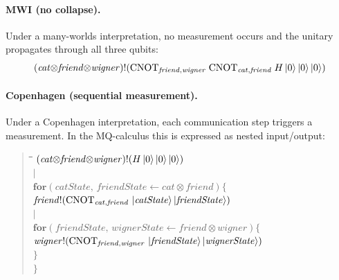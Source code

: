 \documentclass[11pt]{article}
\newcommand{\CNOT}{\mathrm{CNOT}}
\begin{document}
\paragraph{MWI (no collapse).}
Under a many-worlds interpretation, no measurement occurs and the
unitary propagates through all three qubits:
\begin{equation*}
  (\mathit{cat}{\otimes}\mathit{friend}{\otimes}\mathit{wigner})!\!\left(
    \CNOT_{\mathit{friend},\mathit{wigner}}\;
    \CNOT_{\mathit{cat},\mathit{friend}}\;
    H\ket{0}\ket{0}\ket{0}
  \right)
\end{equation*}

\paragraph{Copenhagen (sequential measurement).}
Under a Copenhagen interpretation, each communication step triggers a
measurement.  In the MQ-calculus this is expressed as nested
input/output:

\medskip

\begin{quote}
\begin{minipage}{\dimexpr\textwidth-2em}
\begin{tabbing}
\hspace{2em}\=\hspace{2em}\=\hspace{2em}\=\kill
$(\mathit{cat}{\otimes}\mathit{friend}{\otimes}\mathit{wigner})!\!\left(
  H\ket{0}\ket{0}\ket{0}\right)$ \\[4pt]
$\Big|$ \\[4pt]
$\mathbf{for}\!\left(
  \mathit{catState},\, \mathit{friendState}
  \leftarrow \mathit{cat}{\otimes}\mathit{friend}
\right)\!\Big\{$ \\[4pt]
\> $\mathit{friend}!\!\left(
    \CNOT_{\mathit{cat},\mathit{friend}}\,
    \ket{\mathit{catState}}\ket{\mathit{friendState}}
  \right)$ \\[4pt]
\> $\Big|$ \\[4pt]
\> $\mathbf{for}\!\left(
    \mathit{friendState},\, \mathit{wignerState}
    \leftarrow \mathit{friend}{\otimes}\mathit{wigner}
  \right)\!\Big\{$ \\[4pt]
\>\> $\mathit{wigner}!\!\left(
      \CNOT_{\mathit{friend},\mathit{wigner}}\,
      \ket{\mathit{friendState}}\ket{\mathit{wignerState}}
    \right)$ \\[4pt]
\> $\Big\}$ \\[4pt]
$\Big\}$
\end{tabbing}
\end{minipage}
\end{quote}
\end{document}
